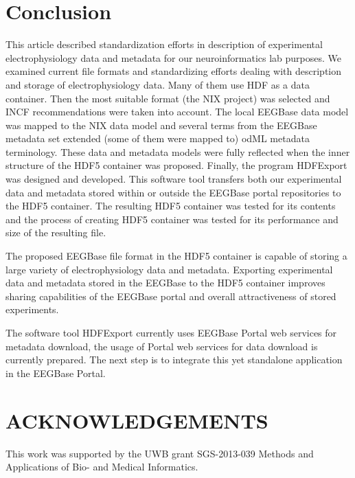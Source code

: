 \documentclass[conference]{IEEEtran}
\begin{document}
\section{Conclusion}
This article described standardization efforts in description of experimental electrophysiology data and metadata for our neuroinformatics lab purposes. We examined current file formats and standardizing efforts dealing with description and storage of electrophysiology data. Many of them use HDF as a data container. Then the most suitable format (the NIX project) was selected and INCF recommendations were taken into account. The local EEGBase data model was mapped to the NIX data model and several terms from the EEGBase metadata set extended (some of them were mapped to) odML metadata terminology. These data and metadata models were fully reflected when the inner structure of the HDF5 container was proposed. Finally, the program HDFExport was designed and developed. This software tool transfers both our experimental data and metadata stored within or outside the EEGBase portal repositories to the HDF5 container. The resulting HDF5 container was tested for its contents and the process of creating HDF5 container was tested for its performance and size of the resulting file.

The proposed EEGBase file format in the HDF5 container is capable of storing a large variety of electrophysiology data and metadata. Exporting experimental data and metadata stored in the EEGBase to the HDF5 container improves sharing capabilities of the EEGBase portal and overall attractiveness of stored experiments.

The software tool HDFExport currently uses EEGBase Portal web services for metadata download, the usage of Portal web services for data download is currently prepared. The next step is to integrate this yet standalone application in the EEGBase Portal.

\noindent

\section*{\uppercase{Acknowledgements}}
\noindent
This work was supported by the UWB grant SGS-2013-039 Methods and Applications of Bio- and Medical Informatics.



\end{document}
